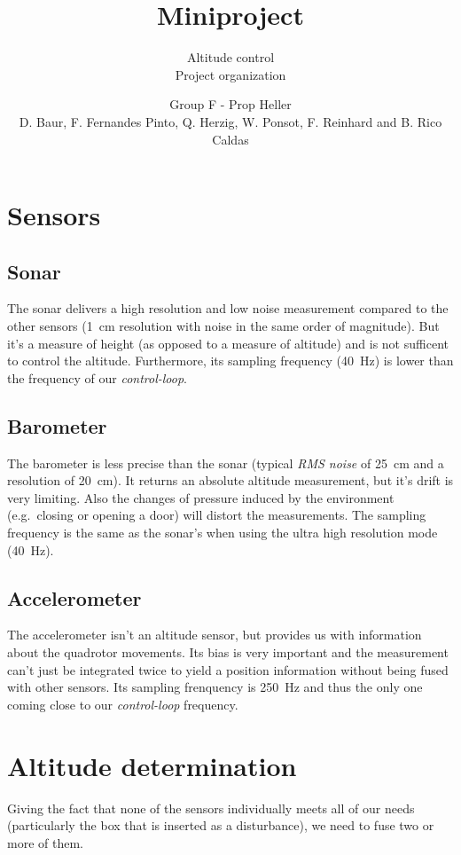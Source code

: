 \documentclass{repMobRob}
\author{Group F - Prop Heller \\ D. Baur, F. Fernandes Pinto, Q. Herzig, W. Ponsot, F. Reinhard and B. Rico Caldas}
\title{Miniproject}
\subtitle{Altitude control \\ \small{Project organization}}
\begin{document}
\thispagestyle{empty}
\maketitle

\section{Sensors}
\subsection{Sonar}
The sonar delivers a high resolution and low noise measurement compared to the other sensors (\SI{1}{\centi\meter} resolution with noise in the same order of magnitude).
But it's a measure of height (as opposed to a measure of altitude) and is not sufficent to control the altitude.
Furthermore, its sampling frequency (\SI{40}{\hertz}) is lower than the frequency of our \emph{control-loop}.

\subsection{Barometer}
The barometer is less precise than the sonar (typical \emph{RMS noise} of \SI{25}{\centi\meter} and a resolution of \SI{20}{\centi\meter}).
It returns an absolute altitude measurement, but it's drift is very limiting.
Also the changes of pressure induced by the environment (e.g.\ closing or opening a door) will distort the measurements.
The sampling frequency is the same as the sonar's when using the ultra high resolution mode (\SI{40}{\hertz}).

\subsection{Accelerometer}
The accelerometer isn't an altitude sensor, but provides us with information about the quadrotor movements.
Its bias is very important and the measurement can't just be integrated twice to yield a position information without being fused with other sensors.
Its sampling frenquency is \SI{250}{\hertz} and thus the only one coming close to our \emph{control-loop} frequency. 

\section{Altitude determination}
Giving the fact that none of the sensors individually meets all of our needs (particularly the box that is inserted as a disturbance), we need to fuse two or more of them. 
\end{document}

